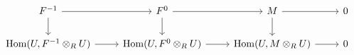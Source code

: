 \documentclass[12pt]{standalone}
\begin{document}
        $$

\begin{tikzcd}
F^{-1} \ar[r] \ar[d] & F^0 \ar[r] \ar[d] & M \ar[r] \ar[d] & 0 \\
\operatorname{Hom}(U,F^{-1}\otimes_R U) \ar[r] & 
\operatorname{Hom}(U,F^0 \otimes_R U) \ar[r] & 
\operatorname{Hom}(U, M \otimes_R U) \ar[r] & 0
\end{tikzcd}
        $$
        
\end{document}
